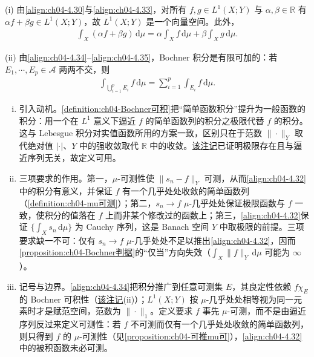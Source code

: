 \documentclass[../../main.tex]{subfiles}%
\begin{document}
\begin{remark}\label{remark:ch04-积分线性}
(i) 由\eqref{align:ch04-4.30}与\eqref{align:ch04-4.33}，对所有 $f,g\in L^1(X;Y)$ 与 $\alpha,\beta\in\mathbb{R}$ 有 $\alpha f+\beta g\in L^1(X;Y)$，故 $L^1(X;Y)$ 是一个向量空间。此外，
\begin{align}
\int_X(\alpha f+\beta g)\,\mathrm{d}\mu=\alpha\int_X f\,\mathrm{d}\mu+\beta\int_X g\,\mathrm{d}\mu. \label{align:ch04-4.35}
\end{align}

(ii) 由\eqref{align:ch04-4.34}--\eqref{align:ch04-4.35}，Bochner 积分是有限可加的：若 $E_1,\cdots ,E_p\in\mathcal{A}$ 两两不交，则
\begin{align}
\int_{\bigcup_{i=1}^p E_i}f\,\mathrm{d}\mu=\sum_{i=1}^p\int_{E_i}f\,\mathrm{d}\mu. \label{align:ch04-4.36}
\end{align}
\end{remark}

\begin{remark}\label{remark:ch04-Bochner可积动机}
\begin{enumerate}[(i)]
\item 引入动机。\cref{definition:ch04-Bochner可积}把“简单函数积分”提升为一般函数的积分：用一个在 $L^1$ 意义下逼近 $f$ 的简单函数列的积分之极限代替 $f$ 的积分。这与 Lebesgue 积分对实值函数所用的方案一致，区别只在于范数 $\|\cdot\|_Y$ 取代绝对值 $|\cdot|$、$Y$ 中的强收敛取代 $\mathbb{R}$ 中的收敛。\hyperref[remark:ch04-Bochner良定义]{该注记}已证明极限存在且与逼近序列无关，故定义可用。

\item 三项要求的作用。第一，$\mu$-可测性使 $\|s_n-f\|_Y$ 可测，从而\eqref{align:ch04-4.32}中的积分有意义，并保证 $f$ 有一个几乎处处收敛的简单函数列（\cref{definition:ch04-mu可测}）；第二，$s_n\to f$ $\mu$-几乎处处保证极限函数与 $f$ 一致，使积分的值落在 $f$ 上而非某个修改过的函数上；第三，\eqref{align:ch04-4.32}保证 $\{\int_X s_n\,\mathrm{d}\mu\}$ 为 Cauchy 序列，这是 Banach 空间 $Y$ 中取极限的前提。三项要求缺一不可：仅有 $s_n\to f$ $\mu$-几乎处处不足以推出\eqref{align:ch04-4.32}，因而\cref{proposition:ch04-Bochner判据}的“仅当”方向失效（$\int_X\|f\|_Y\,\mathrm{d}\mu$ 可能为 $\infty$）。

\item 记号与边界。\eqref{align:ch04-4.34}把积分推广到任意可测集 $E$，其良定性依赖 $f\chi_E$ 的 Bochner 可积性（\hyperref[remark:ch04-Bochner良定义]{该注记}(ii)）；$L^1(X;Y)$ 按 $\mu$-几乎处处相等视为同一元素时才是赋范空间，范数为 $\|\cdot\|_1$。定义要求 $f$ 事先 $\mu$-可测，而不是由逼近序列反过来定义可测性：若 $f$ 不可测而仅有一个几乎处处收敛的简单函数列，则只得到 $f$ 的 $\mu$-可测性（见\cref{proposition:ch04-可推mu可}），\eqref{align:ch04-4.32}中的被积函数未必可测。
\end{enumerate}
\end{remark}
\end{document}
